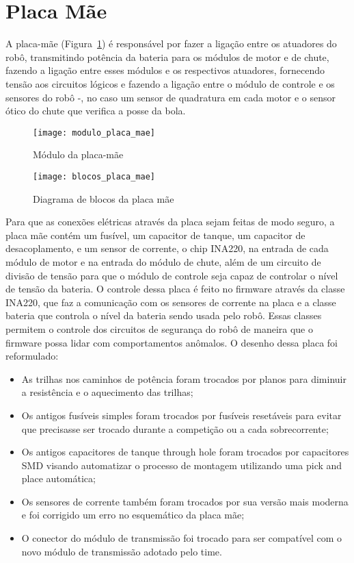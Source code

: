 \section{Placa Mãe}\label{sec:placa_mae}

A placa-mãe (Figura~\ref{fig:modulo_placa_mae}) é responsável por fazer a ligação entre os atuadores do robô, transmitindo potência da bateria para os módulos de motor e de chute, fazendo a ligação entre esses módulos e os respectivos atuadores, fornecendo tensão aos circuitos lógicos e fazendo a ligação entre o módulo de controle e os sensores do robô -, no caso um sensor de quadratura em cada motor e o sensor ótico do chute que verifica a posse da bola. 

\begin{figure}
	\centering
	\texttt{[image: modulo\_placa\_mae]}
	\caption{Módulo da placa-mãe}
	\label{fig:modulo_placa_mae}
\end{figure}

\begin{figure}
	\centering
	\texttt{[image: blocos\_placa\_mae]}
	\caption{Diagrama de blocos da placa mãe}
	\label{fig:blocos_placa_mae}
\end{figure}

Para que as conexões elétricas através da placa sejam feitas de modo seguro, a placa mãe contém um fusível, um capacitor de tanque, um capacitor de desacoplamento, e um sensor de corrente, o chip INA220, na entrada de cada módulo de motor e na entrada do módulo de chute, além de um circuito de divisão de tensão para que o módulo de controle seja capaz de controlar o nível de tensão da bateria.
O controle dessa placa é feito no firmware através da classe INA220, que faz a comunicação com os sensores de corrente na placa e a classe bateria que controla o nível da bateria sendo usada pelo robô. Essas classes permitem o controle dos circuitos de segurança do robô de maneira que o firmware possa lidar com comportamentos anômalos.
O desenho dessa placa foi reformulado:

\begin{itemize}
  \item As trilhas nos caminhos de potência foram trocados por planos para diminuir a resistência e o aquecimento das trilhas;
  \item Os antigos fusíveis simples foram trocados por fusíveis resetáveis para evitar que precisasse ser trocado durante a competição ou a 		cada sobrecorrente;
  \item Os antigos capacitores de tanque through hole foram trocados por capacitores SMD visando automatizar o processo de montagem utilizando 			uma pick and place automática;
  \item Os sensores de corrente também foram trocados por sua versão mais moderna e foi corrigido um erro no esquemático da placa mãe;
  \item O conector do módulo de transmissão foi trocado para ser compatível com o novo módulo de transmissão adotado pelo time.
\end{itemize}


